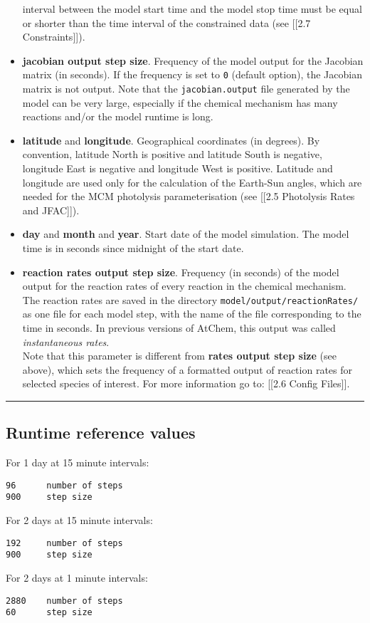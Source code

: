 \begin{itemize}
  interval between the model start time and the model stop time must be
  equal or shorter than the time interval of the constrained data (see
  {[}{[}2.7 Constraints{]}{]}).
\item
  \textbf{jacobian output step size}. Frequency of the model output for
  the Jacobian matrix (in seconds). If the frequency is set to
  \texttt{0} (default option), the Jacobian matrix is not output. Note
  that the \texttt{jacobian.output} file generated by the model can be
  very large, especially if the chemical mechanism has many reactions
  and/or the model runtime is long.
\item
  \textbf{latitude} and \textbf{longitude}. Geographical coordinates (in
  degrees). By convention, latitude North is positive and latitude South
  is negative, longitude East is negative and longitude West is
  positive. Latitude and longitude are used only for the calculation of
  the Earth-Sun angles, which are needed for the MCM photolysis
  parameterisation (see {[}{[}2.5 Photolysis Rates and JFAC{]}{]}).
\item
  \textbf{day} and \textbf{month} and \textbf{year}. Start date of the
  model simulation. The model time is in seconds since midnight of the
  start date.
\item
  \textbf{reaction rates output step size}. Frequency (in seconds) of
  the model output for the reaction rates of every reaction in the
  chemical mechanism. The reaction rates are saved in the directory
  \texttt{model/output/reactionRates/} as one file for each model step,
  with the name of the file corresponding to the time in seconds. In
  previous versions of AtChem, this output was called
  \emph{instantaneous rates}.\\
  Note that this parameter is different from \textbf{rates output step
  size} (see above), which sets the frequency of a formatted output of
  reaction rates for selected species of interest. For more information
  go to: {[}{[}2.6 Config Files{]}{]}.
\end{itemize}

\begin{center}\rule{0.5\linewidth}{\linethickness}\end{center}

\subsection{Runtime reference values}\label{runtime-reference-values}

For 1 day at 15 minute intervals:

\begin{verbatim}
96      number of steps
900     step size
\end{verbatim}

For 2 days at 15 minute intervals:

\begin{verbatim}
192     number of steps
900     step size
\end{verbatim}

For 2 days at 1 minute intervals:

\begin{verbatim}
2880    number of steps
60      step size
\end{verbatim}
